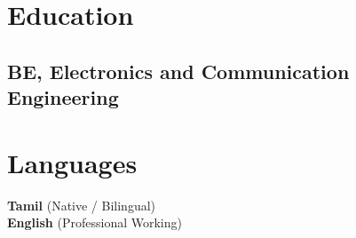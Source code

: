 \documentclass[11pt]{plushcv}
\begin{document}
\begin{minipage}[t]{0.58\textwidth} 
\section{Education}
\fontsize{11pt}{13pt}\selectfont %
\subsection{BE, Electronics and Communication Engineering}
\end{minipage} 
\hfill
\begin{minipage}[t]{0.38\textwidth} 
\section{Languages}
\fontsize{11pt}{13pt}\selectfont %
\textbf{Tamil} (Native / Bilingual) \\
\textbf{English} (Professional Working)
\end{minipage} 
\end{document}
